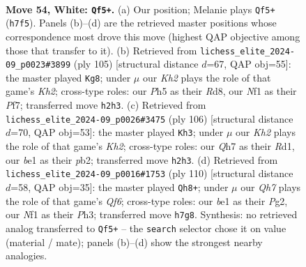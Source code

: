 \documentclass[11pt]{article}
\begin{document}
\clearpage

\begin{figure}[p]\centering
\begin{subfigure}{0.46\textwidth}\centering
\resizebox{\linewidth}{!}{%
\newchessgame
\chessboard[
  setfen={r5r1/p2kq1pQ/7p/3p3P/p2P2P1/4P3/7K/4bN2 w - - 16 54},
  showmover=false,
  pgfstyle=straightmove, color=movearrow, markmove={h7-f5}
]}
\caption{}
\end{subfigure}\hfill
\begin{subfigure}{0.46\textwidth}\centering
\resizebox{\linewidth}{!}{%
\newchessgame
\chessboard[
  setfen={3r4/1p3p1k/1P1p2p1/p2P3p/P1P5/2Q1R2P/5qPK/8 b - - 15 53},
  showmover=false,
  pgfstyle=straightmove, color=movearrow, markmove={h7-g8}
]}
\caption{}
\end{subfigure}
\\[4pt]
\begin{subfigure}{0.46\textwidth}\centering
\resizebox{\linewidth}{!}{%
\newchessgame
\chessboard[
  setfen={8/4Q1pk/3r3p/5p1P/8/3q2P1/1p1p1P1K/3R4 w - - 0 54},
  showmover=false,
  pgfstyle=straightmove, color=movearrow, markmove={h2-h3}
]}
\caption{}
\end{subfigure}\hfill
\begin{subfigure}{0.46\textwidth}\centering
\resizebox{\linewidth}{!}{%
\newchessgame
\chessboard[
  setfen={4k3/4r3/p1Pp1Q2/2q1p2N/p7/7P/1P3PP1/6K1 w - - 3 56},
  showmover=false,
  pgfstyle=straightmove, color=movearrow, markmove={f6-h8}
]}
\caption{}
\end{subfigure}
\caption{\textbf{Move 54, White: \texttt{Qf5+}.} (a) Our position; Melanie plays \texttt{Qf5+} (\texttt{h7f5}). Panels (b)--(d) are the retrieved master positions whose correspondence most drove this move (highest QAP objective among those that transfer to it). (b) Retrieved from \texttt{lichess\_elite\_2024-09\_p0023\#3899} (ply 105) [structural distance $d$=67, QAP obj=55]: the master played \texttt{Kg8}; under $\mu$ our \emph{Kh2} plays the role of that game's \emph{Kh2}; cross-type roles: our \emph{P}h5 as their \emph{R}d8, our \emph{N}f1 as their \emph{P}f7; transferred move \texttt{h2h3}. (c) Retrieved from \texttt{lichess\_elite\_2024-09\_p0026\#3475} (ply 106) [structural distance $d$=70, QAP obj=53]: the master played \texttt{Kh3}; under $\mu$ our \emph{Kh2} plays the role of that game's \emph{Kh2}; cross-type roles: our \emph{Q}h7 as their \emph{R}d1, our \emph{b}e1 as their \emph{p}b2; transferred move \texttt{h2h3}. (d) Retrieved from \texttt{lichess\_elite\_2024-09\_p0016\#1753} (ply 110) [structural distance $d$=58, QAP obj=35]: the master played \texttt{Qh8+}; under $\mu$ our \emph{Qh7} plays the role of that game's \emph{Qf6}; cross-type roles: our \emph{b}e1 as their \emph{P}g2, our \emph{N}f1 as their \emph{P}h3; transferred move \texttt{h7g8}. Synthesis: no retrieved analog transferred to \texttt{Qf5+} -- the \texttt{search} selector chose it on value (material / mate); panels (b)--(d) show the strongest nearby analogies.}
\label{fig:thought-m106}
\end{figure}
\end{document}
